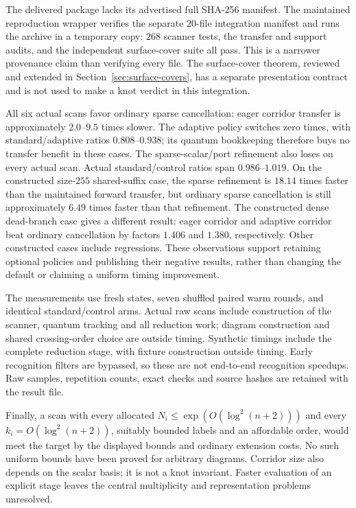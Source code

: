 The delivered package lacks its advertised full SHA-256 manifest.  The
maintained reproduction wrapper verifies the separate $20$-file integration
manifest and runs the archive in a temporary copy: $268$ scanner tests,
the transfer and support audits, and the independent surface-cover suite
all pass.  This is a narrower provenance claim than verifying every file.
The surface-cover theorem, reviewed and extended in Section~\ref{sec:surface-covers},
has a separate presentation contract and is not
used to make a knot verdict in this integration.



All six actual scans favor ordinary sparse cancellation: eager corridor
transfer is approximately $2.0$--$9.5$ times slower.  The adaptive policy
switches zero times, with standard/adaptive ratios $0.808$--$0.938$;
its quantum bookkeeping therefore buys no transfer benefit in these cases.
The sparse-scalar/port refinement also loses on every actual scan.
Actual standard/control ratios span $0.986$--$1.019$.
On the constructed size-$255$ shared-suffix case, the sparse refinement
is $18.14$ times faster than the maintained forward transfer, but ordinary
sparse cancellation is still approximately $6.49$ times faster than that
refinement.  The constructed dense dead-branch case gives a different
result: eager corridor and adaptive corridor beat ordinary cancellation
by factors $1.406$ and $1.380$, respectively.  Other constructed cases
include regressions.  These observations support retaining optional
policies and publishing their negative results, rather than changing the
default or claiming a uniform timing improvement.

The measurements use fresh states, seven shuffled paired warm rounds,
and identical standard/control arms.  Actual raw scans include construction
of the scanner, quantum tracking and all reduction work; diagram construction
and shared crossing-order choice are outside timing.  Synthetic timings
include the complete reduction stage, with fixture construction outside
timing.  Early recognition filters are bypassed, so these are not
end-to-end recognition speedups.  Raw samples, repetition counts, exact
checks and source hashes are retained with the result file.

Finally, a scan with every allocated $N_i\le\exp(O(\log^2(n+2)))$ and
every $k_i=O(\log^2(n+2))$, suitably bounded labels and an affordable order,
would meet the target by the displayed bounds and ordinary extension costs.
No such uniform bounds have been proved for arbitrary diagrams.  Corridor
size also depends on the scalar basis; it is not a knot invariant.  Faster
evaluation of an explicit stage leaves the central multiplicity and
representation problems unresolved.

